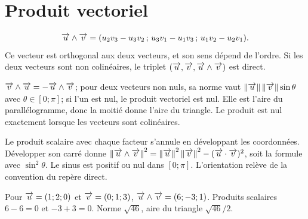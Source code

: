 \section{Produit vectoriel}
\begin{definition}
\[
\overrightarrow{u}\wedge\overrightarrow{v}=(u_2v_3-u_3v_2\,;\,
 u_3v_1-u_1v_3\,;\,u_1v_2-u_2v_1).
\]
Ce vecteur est orthogonal aux deux vecteurs, et son sens dépend de l’ordre. Si les deux vecteurs sont non colinéaires, le triplet $(\overrightarrow{u},\overrightarrow{v},\overrightarrow{u}\wedge\overrightarrow{v})$ est direct.
\end{definition}
\begin{propriete}$\overrightarrow{v}\wedge\overrightarrow{u}=-\overrightarrow{u}\wedge\overrightarrow{v}$; pour deux vecteurs non nuls, sa norme vaut $\left\lVert \overrightarrow{u} \right\rVert\left\lVert \overrightarrow{v} \right\rVert\sin\theta$ avec $\theta\in[0;\pi]$; si l’un est nul, le produit vectoriel est nul. Elle est l’aire du parallélogramme, donc la moitié donne l’aire du triangle. Le produit est nul exactement lorsque les vecteurs sont colinéaires.\end{propriete}
\begin{demonstration}Le produit scalaire avec chaque facteur s’annule en développant les coordonnées. Développer son carré donne $\left\lVert \overrightarrow{u}\wedge\overrightarrow{v} \right\rVert^2=\left\lVert \overrightarrow{u} \right\rVert^2\left\lVert \overrightarrow{v} \right\rVert^2-(\overrightarrow{u}\cdot\overrightarrow{v})^2$, soit la formule avec $\sin^2\theta$. Le sinus est positif ou nul dans $[0;\pi]$. L’orientation relève de la convention du repère direct.\end{demonstration}
\begin{exemple}Pour $\overrightarrow{u}=(1;2;0)$ et $\overrightarrow{v}=(0;1;3)$, $\overrightarrow{u}\wedge\overrightarrow{v}=(6;-3;1)$. Produits scalaires $6-6=0$ et $-3+3=0$. Norme $\sqrt{46}$, aire du triangle $\sqrt{46}/2$.\end{exemple}
